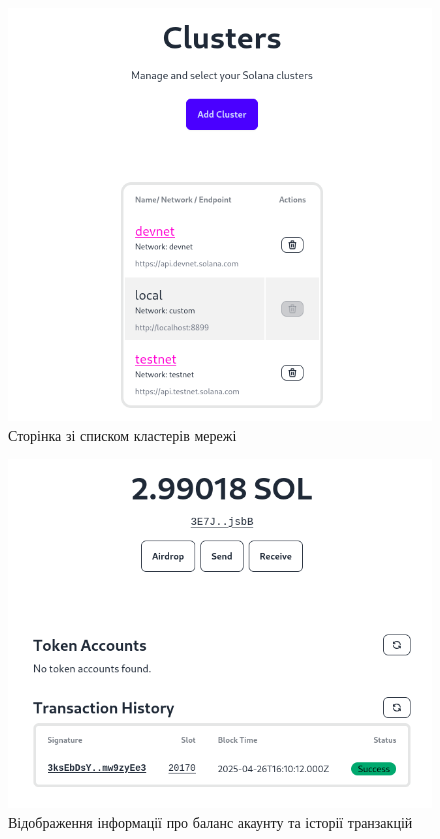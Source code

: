 \documentclass[14pt]{extreport}
\begin{document}
  \begin{figure}[H]
    \centering
    \includegraphics[scale=0.5]{UIClusters}
    \caption{Сторінка зі списком кластерів мережі}
    \label{fig:UIClusters}
  \end{figure}
  
  \begin{figure}[H]
    \centering
    \includegraphics[scale=0.5]{UIAccount}
    \caption{Відображення інформації про баланс акаунту та історії транзакцій}
    \label{fig:UIAccount}
  \end{figure}
  
\end{document}
